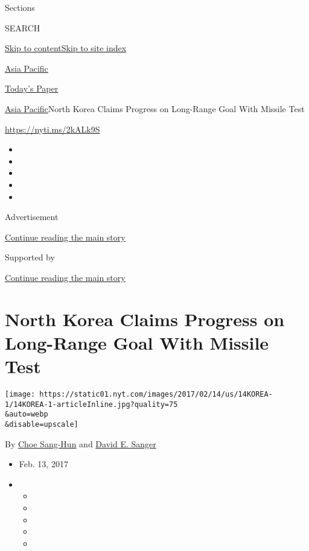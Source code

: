 Sections

SEARCH

\protect\hyperlink{site-content}{Skip to
content}\protect\hyperlink{site-index}{Skip to site index}

\href{https://www.nytimes.com/section/world/asia}{Asia Pacific}

\href{https://myaccount.nytimes.com/auth/login?response_type=cookie\&client_id=vi}{}

\href{https://www.nytimes.com/section/todayspaper}{Today's Paper}

\href{/section/world/asia}{Asia Pacific}\textbar{}North Korea Claims
Progress on Long-Range Goal With Missile Test

\url{https://nyti.ms/2kALk9S}

\begin{itemize}
\item
\item
\item
\item
\item
\end{itemize}

Advertisement

\protect\hyperlink{after-top}{Continue reading the main story}

Supported by

\protect\hyperlink{after-sponsor}{Continue reading the main story}

\hypertarget{north-korea-claims-progress-on-long-range-goal-with-missile-test}{%
\section{North Korea Claims Progress on Long-Range Goal With Missile
Test}\label{north-korea-claims-progress-on-long-range-goal-with-missile-test}}

\texttt{[image: https://static01.nyt.com/images/2017/02/14/us/14KOREA-1/14KOREA-1-articleInline.jpg?quality=75\\\&auto=webp\\\&disable=upscale]}

By \href{http://www.nytimes.com/by/choe-sang-hun}{Choe Sang-Hun} and
\href{http://www.nytimes.com/by/david-e-sanger}{David E. Sanger}

\begin{itemize}
\item
  Feb. 13, 2017
\item
  \begin{itemize}
  \item
  \item
  \item
  \item
  \item
  \end{itemize}
\end{itemize}

